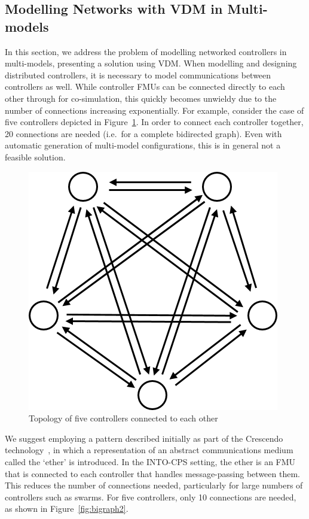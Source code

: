 \subsection{Modelling Networks with VDM in Multi-models}
\label{sec:method:networks}
In this section, we address the problem of modelling networked controllers in multi-models, presenting a solution using VDM. When modelling and designing distributed controllers, it is necessary to model communications between controllers as well. While controller FMUs can be connected directly to each other through for co-simulation, this quickly becomes unwieldy due to the number of connections increasing exponentially. For example, consider the case of five controllers depicted in Figure~\ref{fig:bigraph}. In order to connect each controller together, 20 connections are needed (i.e.\ for a complete bidirected graph). Even with automatic generation of multi-model configurations, this is in general not a feasible solution.

\begin{figure}[hb]
\centering
\includegraphics[scale=0.4]{figures/bigraph}
\caption{Topology of five controllers connected to each other}
\label{fig:bigraph}
\end{figure}

We suggest employing a pattern described initially as part of the Crescendo technology~\cite{Fitzgerald&14c}, in which a representation of an abstract communications medium called the `ether' is introduced. In the INTO-CPS setting, the ether is an FMU that is connected to each controller that handles message-passing between them. This reduces the number of connections needed, particularly for large numbers of controllers such as swarms. For five controllers, only 10 connections are needed, as shown in Figure~\ref{fig:bigraph2}.

